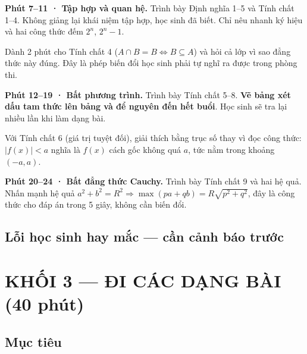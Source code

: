 \documentclass[11pt, a4paper]{article}
\begin{document}
\textbf{Phút 7–11 · Tập hợp và quan hệ.} Trình bày Định nghĩa 1–5 và Tính chất 1–4. Không giảng lại khái niệm tập hợp, học sinh đã biết. Chỉ nêu nhanh ký hiệu và hai công thức đếm $2^n$, $2^n - 1$.

Dành 2 phút cho Tính chất 4 ($A \cap B = B \iff B \subseteq A$) và hỏi cả lớp vì sao đẳng thức này đúng. Đây là phép biến đổi học sinh phải tự nghĩ ra được trong phòng thi.

\textbf{Phút 12–19 · Bất phương trình.} Trình bày Tính chất 5–8. \textbf{Vẽ bảng xét dấu tam thức lên bảng và để nguyên đến hết buổi}. Học sinh sẽ tra lại nhiều lần khi làm dạng bài.

Với Tính chất 6 (giá trị tuyệt đối), giải thích bằng trục số thay vì đọc công thức: $|f(x)| < a$ nghĩa là $f(x)$ cách gốc không quá $a$, tức nằm trong khoảng $(-a, a)$.

\textbf{Phút 20–24 · Bất đẳng thức Cauchy.} Trình bày Tính chất 9 và hai hệ quả. Nhấn mạnh hệ quả $a^2 + b^2 = R^2 \Rightarrow \max(pa + qb) = R\sqrt{p^2+q^2}$, đây là công thức cho đáp án trong 5 giây, không cần biến đổi.

\subsection{Lỗi học sinh hay mắc — cần cảnh báo trước}


\section{KHỐI 3 — ĐI CÁC DẠNG BÀI (40 phút)}

\subsection{Mục tiêu}
\end{document}
